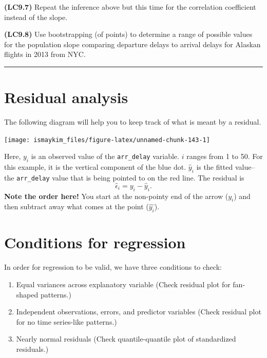 \documentclass[]{tufte-book}
\let\oldrule=\rule
\renewcommand{\rule}[1]{\oldrule{\linewidth}}
\providecommand{\tightlist}{%
  \setlength{\itemsep}{0pt}\setlength{\parskip}{0pt}}
\begin{document}
\textbf{(LC9.7)} Repeat the inference above but this time for the
correlation coefficient instead of the slope.

\textbf{(LC9.8)} Use bootstrapping (of points) to determine a range of
possible values for the population slope comparing departure delays to
arrival delays for Alaskan flights in 2013 from NYC.

\begin{center}\rule{0.5\linewidth}{\linethickness}\end{center}

\section{Residual analysis}\label{resid}

The following diagram will help you to keep track of what is meant by a
residual.

\begin{center}\texttt{[image: ismaykim\_files/figure-latex/unnamed-chunk-143-1]} \end{center}

Here, \(y_i\) is an observed value of the \texttt{arr\_delay} variable.
\(i\) ranges from 1 to 50. For this example, it is the vertical
component of the blue dot. \(\hat{y}_i\) is the fitted value--the
\texttt{arr\_delay} value that is being pointed to on the red line. The
residual is \[\hat{\epsilon}_i = y_i - \hat{y}_i.\] \textbf{Note the
order here!} You start at the non-pointy end of the arrow (\(y_i\)) and
then subtract away what comes at the point (\(\hat{y_i}\)).

\section{Conditions for regression}\label{conditions-for-regression}

In order for regression to be valid, we have three conditions to check:

\begin{enumerate}
\def\labelenumi{\arabic{enumi}.}
\tightlist
\item
  Equal variances across explanatory variable (Check residual plot for
  fan-shaped patterns.)
\item
  Independent observations, errors, and predictor variables (Check
  residual plot for no time series-like patterns.)
\item
  Nearly normal residuals (Check quantile-quantile plot of standardized
  residuals.)
\end{enumerate}
\end{document}
